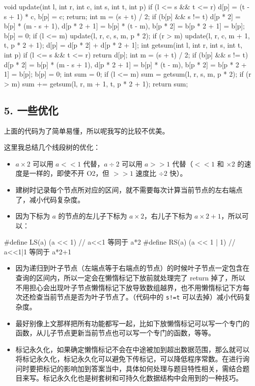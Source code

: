 \begin{cppcode}
void update(int l, int r, int c, int s, int t, int p) {
  if (l <= s && t <= r) {
    d[p] = (t - s + 1) * c, b[p] = c;
    return;
  }
  int m = (s + t) / 2;
  if (b[p] && s != t)
    d[p * 2] = b[p] * (m - s + 1), d[p * 2 + 1] = b[p] * (t - m),
          b[p * 2] = b[p * 2 + 1] = b[p];
  b[p] = 0;
  if (l <= m) update(l, r, c, s, m, p * 2);
  if (r > m) update(l, r, c, m + 1, t, p * 2 + 1);
  d[p] = d[p * 2] + d[p * 2 + 1];
}
int getsum(int l, int r, int s, int t, int p) {
  if (l <= s && t <= r) return d[p];
  int m = (s + t) / 2;
  if (b[p] && s != t)
    d[p * 2] = b[p] * (m - s + 1), d[p * 2 + 1] = b[p] * (t - m),
          b[p * 2] = b[p * 2 + 1] = b[p];
  b[p] = 0;
  int sum = 0;
  if (l <= m) sum = getsum(l, r, s, m, p * 2);
  if (r > m) sum += getsum(l, r, m + 1, t, p * 2 + 1);
  return sum;
}
\end{cppcode}

\subsection{5. 一些优化}

上面的代码为了简单易懂，所以呢我写的比较不优美。

这里我总结几个线段树的优化：

\begin{itemize}
\item $a\times 2$ 可以用 $a<<1$ 代替，$a\div 2$ 可以用 $a>>1$ 代替（$<<1$ 和 $\times 2$ 的速度是一样的，即使不开 O2，但 $>>1$ 速度比 $\div 2$ 快）。
\item 建树时记录每个节点所对应的区间，就不需要每次计算当前节点的左右端点了，减小代码复杂度。
\item 因为下标为 $a$ 的节点的左儿子下标为 $a\times 2$，右儿子下标为 $a\times 2+1$，所以可以：
\end{itemize}

\begin{cppcode}
#define LS(a) (a << 1)
// a<<1 等同于 a*2
#define RS(a) (a << 1 | 1)
// a<<1|1 等同于 a*2+1
\end{cppcode}

\begin{itemize}
\item 因为递归到叶子节点（左端点等于右端点的节点）的时候叶子节点一定包含在查询的区间内，所以一定会在懒惰标记下放前就处理完了 return 掉了，所以不用担心会出现叶子节点懒惰标记下放导致数组越界，也不用懒惰标记下方每次还检查当前节点是否为叶子节点了。（代码中的 \texttt{s!=t} 可以去掉）减小代码复杂度。
\item 最好别像上文那样把所有功能都写一起，比如下放懒惰标记可以写一个专门的函数，从儿子节点更新当前节点也可以写一个专门的函数，等等。
\item 标记永久化，如果确定懒惰标记不会在中途被加到超出数据范围，那么就可以将标记永久化，标记永久化可以避免下传标记，可以降低程序常数。在进行询问时要把标记的影响加到答案当中，具体如何处理与题目特性相关，需结合题目来写。标记永久化也是树套树和可持久化数据结构中会用到的一种技巧。
\end{itemize}

